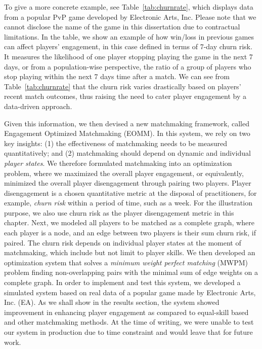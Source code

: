 To give a more concrete example, see Table~\ref{tab:churnrate}, which displays data from a popular PvP game developed by Electronic Arts, Inc. Please note that we cannot disclose the name of the game in this dissertation due to contractual limitations. In the table, we show an example of how win/loss in previous games can affect players' engagement, in this case defined in terms of 7-day churn risk. It measures the likelihood of one player stopping playing the game in the next 7 days, or from a population-wise perspective, the ratio of a group of players who stop playing within the next 7 days time after a match. We can see from Table~\ref{tab:churnrate} that the churn risk varies drastically based on players' recent match outcomes, thus raising the need to cater player engagement by a data-driven approach. 

Given this information, we then devised a new matchmaking framework, called Engagement Optimized Matchmaking (EOMM). In this system, we rely on two key insights: (1) the effectiveness of matchmaking needs to be measured quantitatively; and (2) matchmaking should depend on dynamic and individual \emph{player states}. We therefore formulated matchmaking into an optimization problem, where we maximized the overall player engagement, or equivalently, minimized the overall player disengagement through pairing two players. Player disengagement is a chosen quantitative metric at the disposal of practitioners, for example, \emph{churn risk} within a period of time, such as a week. For the illustration purpose, we also use churn risk as the player disengagement metric in this chapter. Next, we modeled all players to be matched as a complete graph, where each player is a node, and an edge between two players is their sum churn risk, if paired. The churn risk depends on individual player states at the moment of matchmaking, which include but not limit to player skills. We then developed an optimization system that solves a \emph{minimum weight perfect matching} (MWPM) problem finding non-overlapping pairs with the minimal sum of edge weights on a complete graph. In order to implement and test this system, we developed a simulated system based on real data of a popular game made by Electronic Arts,\! Inc.\! (EA). As we shall show in the results section, the system showed improvement in enhancing player engagement as compared to equal-skill based and other matchmaking methods. At the time of writing, we were unable to test our system in production due to time constraint and would leave that for future work.

